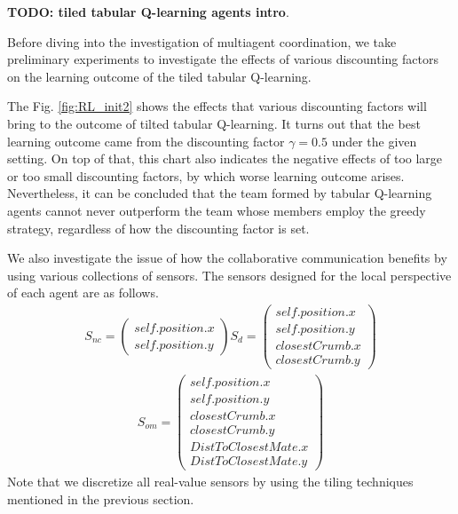 \documentclass[conference]{IEEEtran}
\begin{document}
\textbf{TODO: tiled tabular Q-learning agents intro}.

Before diving into the investigation of multiagent coordination, we take 
preliminary experiments to investigate the effects of various discounting
factors on the learning outcome of the tiled tabular Q-learning.

The Fig. \ref{fig:RL_init2} shows the effects that various discounting factors
will bring to the outcome of tilted tabular Q-learning. It turns out that the
best learning outcome came from the discounting factor $\gamma = 0.5$ under
the given setting. On top of that, this chart also indicates the negative
effects of too large or too small discounting factors, by which worse learning
outcome arises. Nevertheless, it can be concluded that the team formed by
tabular Q-learning agents cannot never outperform the team whose members
employ the greedy strategy, regardless of how the discounting factor is set.

We also investigate the issue of how the collaborative communication benefits
by using various collections of sensors.
The sensors designed for the local perspective of each agent are as follows. 
\begin{align}
    S_{nc} = \left( \begin{array}{c}
      self.position.x \\
      self.position.y 
  \end{array} \right)
    S_{d} = \left( \begin{array}{c}
      self.position.x \\
      self.position.y \\
      closestCrumb.x \\
      closestCrumb.y 
  \end{array} \right)
    \nonumber
\end{align}
\begin{align}
        S_{om} = \left( \begin{array}{c}
      self.position.x \\
      self.position.y \\
      closestCrumb.x \\
      closestCrumb.y  \\
      DistToClosestMate.x \\
      DistToClosestMate.y 
  \end{array} \right)
        \nonumber
\end{align}
Note that we discretize all real-value sensors by using the tiling
techniques mentioned in the previous section. 
\end{document}
